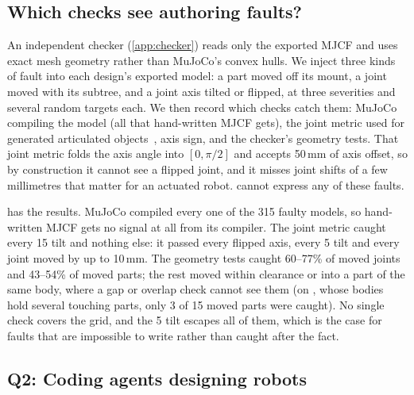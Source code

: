 \subsection{Which checks see authoring faults?}
\label{sec:detect}
An independent checker (\cref{app:checker}) reads only the exported MJCF and uses
exact mesh geometry rather than MuJoCo's convex hulls. We inject three kinds of fault into each
design's exported model: a part moved off its mount, a joint moved with its subtree, and a joint
axis tilted or flipped, at three severities and several random targets each. We then record
which checks catch them: MuJoCo compiling the model (all that hand-written MJCF gets), the joint
metric used for generated articulated objects~\citep{le2025articulateanything}, axis sign, and
the checker's geometry tests. That joint metric folds the axis angle into $[0,\pi/2]$ and accepts
50\,mm of axis offset, so by construction it cannot see a flipped joint, and it misses joint
shifts of a few millimetres that matter for an actuated robot. \ms cannot express any of these
faults.

\begin{table}[t]
\caption{Share of injected faults each check catches, over seven designs (five random targets
per design, fault and size; the quadrotor has no joints or non-root parts and is left out).}
\label{tab:detect}
\centering\small

\end{table}

 has the results. MuJoCo compiled every one of the 315 faulty models, so
hand-written MJCF gets no signal at all from its compiler. The joint metric caught every
15\textdegree{} tilt and nothing else: it passed every flipped axis, every 5\textdegree{} tilt
and every joint moved by up to 10\,mm. The geometry tests caught 60--77\% of moved joints and
43--54\% of moved parts; the rest moved within clearance or into a part of the same body, where a
gap or overlap check cannot see them (on , whose bodies hold several touching parts,
only 3 of 15 moved parts were caught). No single check covers the grid, and the 5\textdegree{}
tilt escapes all of them, which is the case for faults that are impossible to write rather than
caught after the fact.

\subsection{Q2: Coding agents designing robots}
\label{sec:agents}

